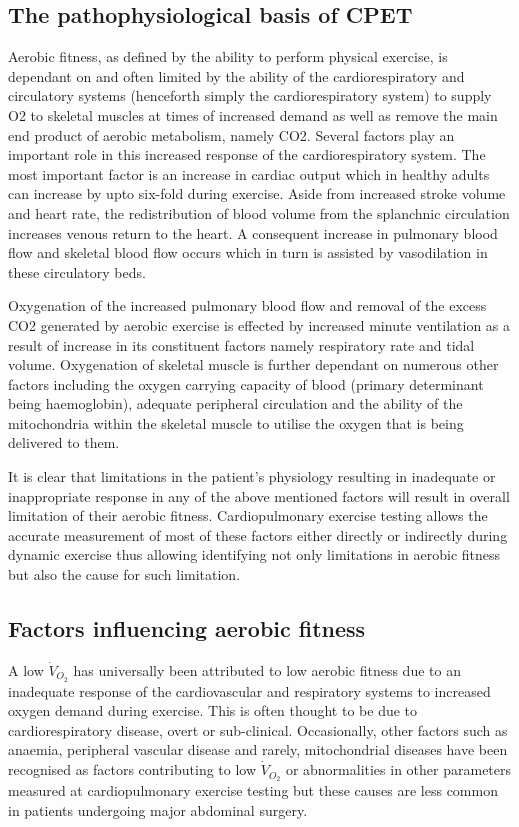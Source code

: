 \subsection{The pathophysiological basis of CPET}
Aerobic fitness, as defined by the ability to perform physical exercise, is dependant on and often limited by the ability of the cardiorespiratory and circulatory systems (henceforth simply the cardiorespiratory system) to supply O2 to skeletal muscles at times of increased demand as well as remove the main end product of aerobic metabolism, namely CO2. Several factors play an important role in this increased response of the cardiorespiratory system. The most important factor is an increase in cardiac output which in healthy adults can increase by upto six-fold during exercise. Aside from increased stroke volume and heart rate, the redistribution of blood volume from the splanchnic circulation increases venous return to the heart. A consequent increase in pulmonary blood flow and skeletal blood flow occurs which in turn is assisted by vasodilation in these circulatory beds.

Oxygenation of the increased pulmonary blood flow and removal of the excess CO2 generated by aerobic exercise is effected by increased minute ventilation as a result of increase in its constituent factors namely respiratory rate and tidal volume. Oxygenation of skeletal muscle is further dependant on numerous other factors including the oxygen carrying capacity of blood (primary determinant being haemoglobin), adequate peripheral circulation and the ability of the mitochondria within the skeletal muscle to utilise the oxygen that is being delivered to them. 

It is clear that limitations in the patient's physiology resulting in inadequate or inappropriate response in any of the above mentioned factors will result in overall limitation of their aerobic fitness. Cardiopulmonary exercise testing allows the accurate measurement of most of these factors either directly or indirectly during dynamic exercise thus allowing identifying not only limitations in aerobic fitness but also the cause for such limitation. 

\subsection{Factors influencing aerobic fitness}
A low $\dot{V}_{O_2}$ has universally been attributed to low aerobic fitness due to an inadequate response of the cardiovascular and respiratory systems to increased oxygen demand during exercise. This is often thought to be due to cardiorespiratory disease, overt or sub-clinical. Occasionally, other factors such as anaemia, peripheral vascular disease and rarely, mitochondrial diseases have been recognised as factors contributing to low $\dot{V}_{O_2}$ or abnormalities in other parameters measured at cardiopulmonary exercise testing but these causes are less common in patients undergoing major abdominal surgery.

